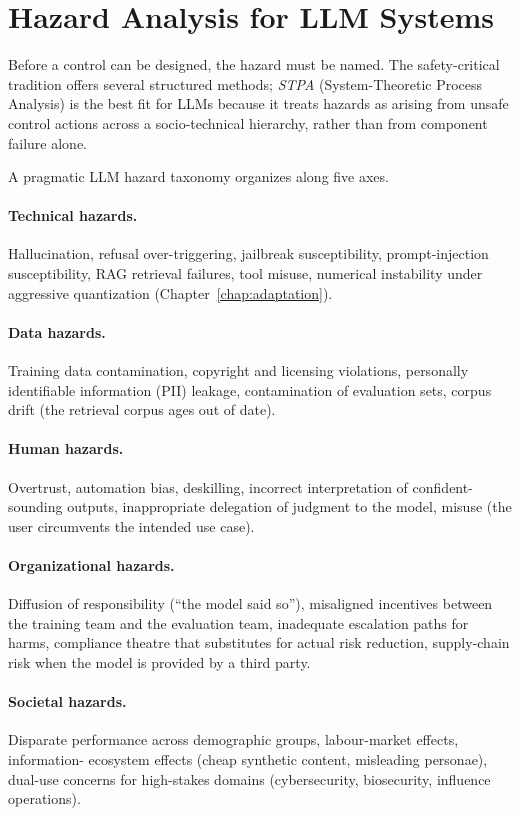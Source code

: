 \section{Hazard Analysis for LLM Systems}

Before a control can be designed, the hazard must be named. The
safety-critical tradition offers several structured methods;
\emph{STPA} (System-Theoretic Process Analysis)
\citep{leveson2011engineering} is the best fit for LLMs because
it treats hazards as arising from unsafe control actions across
a socio-technical hierarchy, rather than from component failure
alone.

A pragmatic LLM hazard taxonomy organizes along five axes.

\paragraph{Technical hazards.} Hallucination, refusal
over-triggering, jailbreak susceptibility, prompt-injection
susceptibility, RAG retrieval failures, tool misuse, numerical
instability under aggressive quantization (Chapter~\ref{chap:adaptation}).

\paragraph{Data hazards.} Training data contamination,
copyright and licensing violations, personally identifiable
information (PII) leakage, contamination of evaluation sets,
corpus drift (the retrieval corpus ages out of date).

\paragraph{Human hazards.} Overtrust, automation bias,
deskilling, incorrect interpretation of confident-sounding
outputs, inappropriate delegation of judgment to the model,
misuse (the user circumvents the intended use case).

\paragraph{Organizational hazards.} Diffusion of responsibility
(``the model said so''), misaligned incentives between the
training team and the evaluation team, inadequate escalation
paths for harms, compliance theatre that substitutes for
actual risk reduction, supply-chain risk when the model is
provided by a third party.

\paragraph{Societal hazards.} Disparate performance across
demographic groups, labour-market effects, information-
ecosystem effects (cheap synthetic content, misleading
personae), dual-use concerns for high-stakes domains
(cybersecurity, biosecurity, influence operations).

